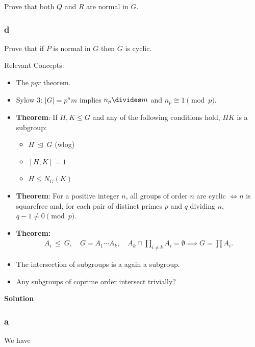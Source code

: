 Prove that both \(Q\) and \(R\) are normal in \(G\).

\hypertarget{d-3}{%
\subsubsection{d}\label{d-3}}

Prove that if \(P\) is normal in \(G\) then \(G\) is cyclic.

\begin{solution}

Relevant Concepts:

\begin{itemize}
\item
  The \(pqr\) theorem.
\item
  Sylow 3: \({\left\lvert {G} \right\rvert} = p^n m\) implies
  \(n_p \divides m\) and \(n_p \cong 1 \pmod p\).
\item
  \textbf{Theorem}: If \(H, K \leq G\) and any of the following
  conditions hold, \(HK\) is a subgroup:

  \begin{itemize}
  \tightlist
  \item
    \(H{~\trianglelefteq~}G\) (wlog)
  \item
    \([H, K] = 1\)
  \item
    \(H \leq N_G(K)\)
  \end{itemize}
\item
  \textbf{Theorem}: For a positive integer \(n\), all groups of order
  \(n\) are cyclic \(\iff n\) is squarefree and, for each pair of
  distinct primes \(p\) and \(q\) dividing \(n\),
  \(q - 1 \neq 0 \pmod p\).
\item
  \textbf{Theorem:}
  \begin{align*}
  A_i{~\trianglelefteq~}G, \quad G = A_1 \cdots A_k,\quad A_k \cap\prod_{i\neq k} A_i = \emptyset \implies G = \prod A_i
  .\end{align*}
\item
  The intersection of subgroups is a again a subgroup.
\item
  Any subgroups of coprime order intersect trivially?
\end{itemize}

\textbf{Solution}

\hypertarget{a-13}{%
\subsubsection{a}\label{a-13}}

We have


\end{solution}
